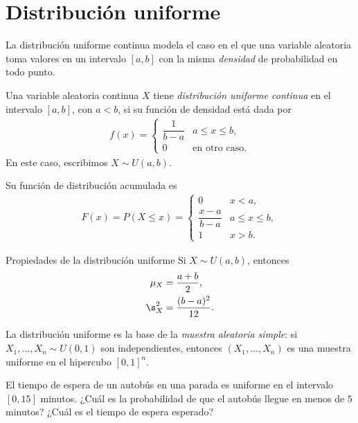 
\section{Distribución uniforme}

La distribución uniforme continua modela el caso en el que una variable aleatoria toma
valores en un intervalo $[a,b]$ con la misma \emph{densidad} de probabilidad en todo punto.

\begin{definicion}
Una variable aleatoria continua $X$ tiene \emph{distribución uniforme continua} en el
intervalo $[a,b]$, con $a<b$, si su función de densidad está dada por
\begin{align}
 \label{eq:2.8.1}
 f(x) =
 \begin{cases}
  \dfrac{1}{b-a} & a \leq x \leq b, \\
  0 & \text{en otro caso.}
 \end{cases}
\end{align}
En este caso, escribimos $X \sim U(a,b)$.
\end{definicion}

Su función de distribución acumulada es
\begin{align}
 \label{eq:2.8.2}
 F(x) = P(X \leq x) =
 \begin{cases}
  0 & x < a, \\
  \dfrac{x-a}{b-a} & a \leq x \leq b, \\
  1 & x > b.
 \end{cases}
\end{align}

{Propiedades de la distribución uniforme} Si $X \sim U(a,b)$, entonces
\begin{align}
 \mu_X &= \frac{a+b}{2}, \\
 \s_X^2 &= \frac{(b-a)^2}{12}.
\end{align}

\begin{observacion}
La distribución uniforme es la base de la \emph{muestra aleatoria simple}: si
$X_1,\dots,X_n \sim U(0,1)$ son independientes, entonces $(X_1,\dots,X_n)$ es una muestra
uniforme en el hipercubo $[0,1]^n$.
\end{observacion}

\begin{ejemplo}
 \label{exmp:2.8.1}
El tiempo de espera de un autobús en una parada es uniforme en el intervalo
$[0,15]$ minutos. ¿Cuál es la probabilidad de que el autobús llegue en menos de
$5$ minutos? ¿Cuál es el tiempo de espera esperado?
\end{ejemplo}

